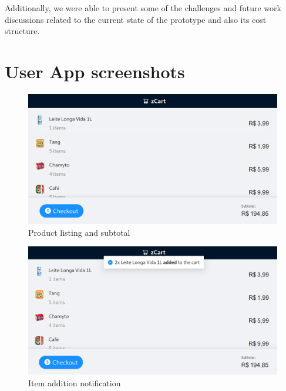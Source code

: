 \documentclass[openright]{normas-utf-tex} %
\begin{document}
Additionally, we were able to present some of the challenges and future work
discussions related to the current state of the prototype and also its cost
structure.

\clearpage
\label{bibstart}

\label{bibend}

\setcounter{chapter}{0}
\apendice
\chapter{User App screenshots}
\label{ap:userapp}

\begin{figure}[H]
	\centering
	\includegraphics[width=1\textwidth]{./images/userapp.png}
	\caption[]{Product listing and subtotal}
\end{figure}

\begin{figure}[H]
	\centering
	\includegraphics[width=1\textwidth]{./images/userapp2.png}
	\caption[]{Item addition notification}
\end{figure}
\end{document}
